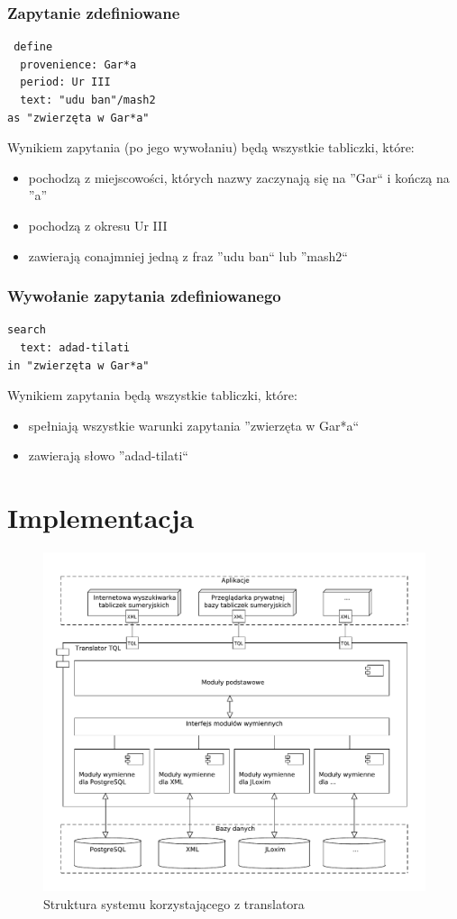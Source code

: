 \documentclass{pracamgr}
\begin{document}
\subsection{Zapytanie zdefiniowane}
\begin{verbatim}
 define
  provenience: Gar*a
  period: Ur III
  text: "udu ban"/mash2
as "zwierzęta w Gar*a"
\end{verbatim}
Wynikiem zapytania (po jego wywołaniu) będą wszystkie tabliczki, które:
\begin{itemize}
\item pochodzą z miejscowości, których nazwy zaczynają się na ''Gar`` i kończą na ''a''
\item pochodzą z okresu Ur III
\item zawierają conajmniej jedną z fraz ''udu ban`` lub ''mash2``
\end{itemize}

\subsection{Wywołanie zapytania zdefiniowanego}
\begin{verbatim}
search
  text: adad-tilati
in "zwierzęta w Gar*a"
\end{verbatim}
Wynikiem zapytania będą wszystkie tabliczki, które:
\begin{itemize}
 \item spełniają wszystkie warunki zapytania ''zwierzęta w Gar*a``
\item zawierają słowo ''adad-tilati``
\end{itemize}

\chapter{Implementacja}
\begin{figure}[h]
 \centering
 \includegraphics[width=500px,bb=0 0 608 517]{./diagramy/struktura2.pdf}
 \caption{Struktura systemu korzystającego z translatora}
\end{figure}
\end{document}
